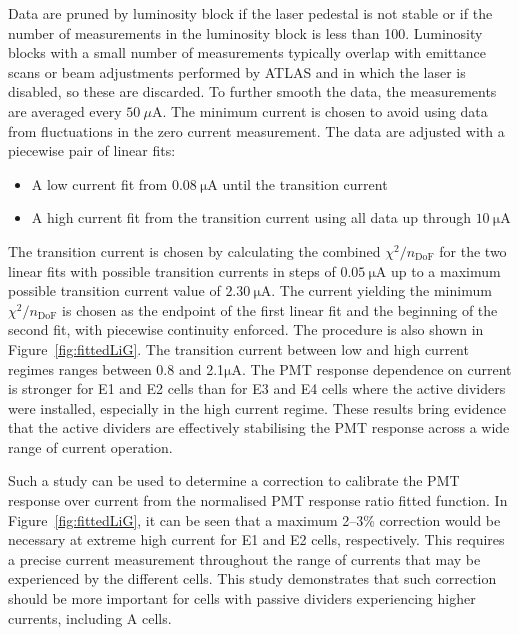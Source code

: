 Data are pruned by luminosity block if the laser pedestal is not stable or if the number of measurements in the luminosity block is less than 100. Luminosity blocks with a small number of measurements typically overlap with emittance scans or beam adjustments performed by ATLAS and in which the laser is disabled, so these are discarded. To further smooth the data, the measurements are averaged every $50~\mu\mathrm{A}$. The minimum current is chosen to avoid using data from fluctuations in the zero current measurement. The data are adjusted with a piecewise pair of linear fits:

\begin{itemize}
  \item A low current fit from $0.08~\mathrm{\mu A}$ until the transition current
  \item A high current fit from the transition current using all data up through $10~\mathrm{\mu A}$ 
\end{itemize}

The transition current is chosen by calculating the combined $\chi^2/n_{\mathrm{DoF}}$ for the two linear fits with possible transition currents in steps of $0.05~\mathrm{\mu A}$ up to a maximum possible transition current value of $2.30~\mathrm{\mu A}$. The current yielding the minimum $\chi^2/n_{\mathrm{DoF}}$ is chosen as the endpoint of the first linear fit and the beginning of the second fit, with piecewise continuity enforced. The procedure is also shown in Figure~\ref{fig:fittedLiG}. The transition current between low and high current regimes ranges between 0.8 and 2.1$\mathrm{\mu A}$. The PMT response dependence on current is stronger for E1 and E2 cells than for E3 and E4 cells where the active dividers were installed, especially in the high current regime. These results bring evidence that the active dividers are effectively stabilising the PMT response across a wide range of current operation.

Such a study can be used to determine a correction to calibrate the PMT response over current from the normalised PMT response ratio fitted function. In  Figure~\ref{fig:fittedLiG}, it can be seen that a maximum 2--3\% correction would be necessary at extreme high current for E1 and E2 cells, respectively. This requires a precise current measurement throughout the range of currents that may be experienced by the different cells. This study demonstrates that such correction should be more important for cells with passive dividers experiencing higher currents, including A cells. 


